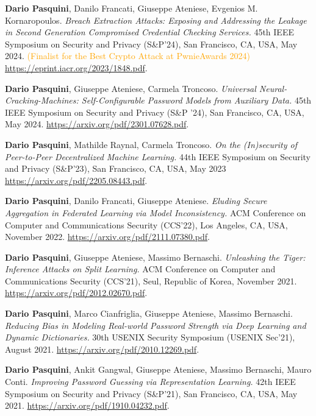 \documentclass[margin, 10pt]{article} %
\begin{document}
\begin{thebibliography}{99}


\textbf{Dario Pasquini}, Danilo Francati, Giuseppe Ateniese, Evgenios M. Kornaropoulos.
\textit{Breach Extraction Attacks: Exposing and Addressing the Leakage in Second Generation Compromised Credential Checking Services.}
45th IEEE Symposium on Security and Privacy (S\&P'24), San Francisco, CA, USA, May 2024. \textcolor{orange}{(Finalist for the Best Crypto Attack at PwnieAwards 2024)} \url{https://eprint.iacr.org/2023/1848.pdf}. 

\textbf{Dario Pasquini}, Giuseppe Ateniese,  Carmela Troncoso. \textit{Universal Neural-Cracking-Machines: Self-Configurable Password Models from Auxiliary Data.} 45th IEEE Symposium on Security and Privacy (S\&P '24), San Francisco, CA, USA, May 2024. \url{https://arxiv.org/pdf/2301.07628.pdf}. 

\textbf{Dario Pasquini}, Mathilde Raynal, Carmela Troncoso. \textit{On the (In)security of Peer-to-Peer Decentralized Machine Learning.} 44th IEEE Symposium on Security and Privacy (S\&P'23), San Francisco, CA, USA, May 2023 \url{https://arxiv.org/pdf/2205.08443.pdf}. 

\textbf{Dario Pasquini}, Danilo Francati, Giuseppe Ateniese. \textit{Eluding Secure Aggregation in Federated Learning via Model Inconsistency.} ACM Conference on Computer and Communications Security (CCS'22), Los Angeles, CA, USA, November 2022. \url{https://arxiv.org/pdf/2111.07380.pdf}. 

\textbf{Dario Pasquini}, Giuseppe Ateniese, Massimo Bernaschi. \textit{Unleashing the Tiger: Inference Attacks on Split Learning.} ACM Conference on Computer and Communications Security (CCS'21),  Seul, Republic of Korea, November 2021. \url{https://arxiv.org/pdf/2012.02670.pdf}. 

\textbf{Dario Pasquini}, Marco Cianfriglia, Giuseppe Ateniese, Massimo Bernaschi. \textit{Reducing Bias in Modeling Real-world Password Strength via Deep Learning and Dynamic Dictionaries.} 30th USENIX Security Symposium (USENIX Sec'21), August 2021. \url{https://arxiv.org/pdf/2010.12269.pdf}. 
	
 \textbf{Dario Pasquini}, Ankit Gangwal, Giuseppe Ateniese, Massimo Bernaschi, Mauro Conti. \textit{Improving Password Guessing via Representation Learning.}  42th IEEE Symposium on Security and Privacy (S\&P'21), San Francisco, CA, USA, May 2021. \url{https://arxiv.org/pdf/1910.04232.pdf}. 

\end{thebibliography}
\end{document}
